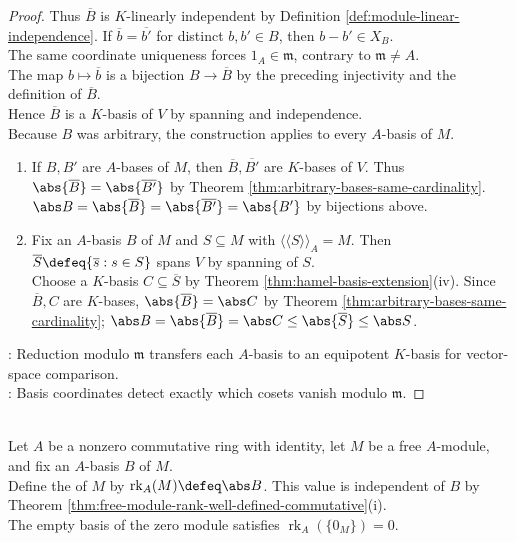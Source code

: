 \begin{theorem}
\begin{proof}
Thus $\overline B$ is $K$-linearly independent by Definition \ref{def:module-linear-independence}. If $\overline b=\overline{b'}$ for distinct $b,b'\in B$, then $b-b'\in X_B$.\\
The same coordinate uniqueness forces $1_A\in\mathfrak{m}$, contrary to $\mathfrak{m}\neq A$.\\
The map $b\mapsto\overline b$ is a bijection $B\to\overline B$ by the preceding injectivity and the definition of $\overline B$.\\
Hence $\overline B$ is a $K$-basis of $V$ by spanning and independence.\\
Because $B$ was arbitrary, the construction applies to every $A$-basis of $M$.
\begin{enumerate}[label=(\roman*)]
\setlength{\itemsep}{0pt}
\item If $B,B'$ are $A$-bases of $M$, then $\overline B,\overline{B'}$ are $K$-bases of $V$. Thus $\abs{\overline B}=\abs{\overline{B'}}$ by Theorem \ref{thm:arbitrary-bases-same-cardinality}.\\
$\abs B=\abs{\overline B}=\abs{\overline{B'}}=\abs{B'}$ by bijections above.
\item Fix an $A$-basis $B$ of $M$ and $S\subseteq M$ with $\langle\!\langle S\rangle\!\rangle_A=M$. Then $\overline S\defeq\{\overline s:s\in S\}$ spans $V$ by spanning of $S$.\\
Choose a $K$-basis $C\subseteq\overline S$ by Theorem \ref{thm:hamel-basis-extension}(iv). Since $\overline B,C$ are $K$-bases, $\abs{\overline B}=\abs C$ by Theorem \ref{thm:arbitrary-bases-same-cardinality}; $\abs B=\abs{\overline B}=\abs C\leq\abs{\overline S}\leq\abs S$.
\end{enumerate}
: Reduction modulo $\mathfrak{m}$ transfers each $A$-basis to an equipotent $K$-basis for vector-space comparison.\\
: Basis coordinates detect exactly which cosets vanish modulo $\mathfrak{m}$.
\end{proof}
\end{theorem}

\begin{definition} \label{def:rank-of-free-module} \\
Let $A$ be a nonzero commutative ring with identity, let $M$ be a free $A$-module, and fix an $A$-basis $B$ of $M$.\\
Define the  of $M$ by $\operatorname{rk}_A(M)\defeq\abs B$. This value is independent of $B$ by Theorem \ref{thm:free-module-rank-well-defined-commutative}(i).\\
The empty basis of the zero module satisfies $\operatorname{rk}_A(\{0_M\})=0$.
\end{definition}


